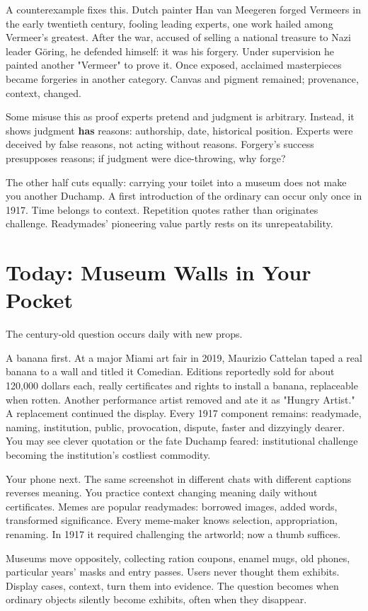 A counterexample fixes this. Dutch painter Han van Meegeren forged Vermeers in the early twentieth century, fooling leading experts, one work hailed among Vermeer's greatest. After the war, accused of selling a national treasure to Nazi leader Göring, he defended himself: it was his forgery. Under supervision he painted another "Vermeer" to prove it. Once exposed, acclaimed masterpieces became forgeries in another category. Canvas and pigment remained; provenance, context, changed.

Some misuse this as proof experts pretend and judgment is arbitrary. Instead, it shows judgment \textbf{has} reasons: authorship, date, historical position. Experts were deceived by false reasons, not acting without reasons. Forgery's success presupposes reasons; if judgment were dice-throwing, why forge?

The other half cuts equally: carrying your toilet into a museum does not make you another Duchamp. A first introduction of the ordinary can occur only once in 1917. Time belongs to context. Repetition quotes rather than originates challenge. Readymades' pioneering value partly rests on its unrepeatability.

\section{Today: Museum Walls in Your Pocket}
The century-old question occurs daily with new props.

A banana first. At a major Miami art fair in 2019, Maurizio Cattelan taped a real banana to a wall and titled it Comedian. Editions reportedly sold for about 120,000 dollars each, really certificates and rights to install a banana, replaceable when rotten. Another performance artist removed and ate it as "Hungry Artist." A replacement continued the display. Every 1917 component remains: readymade, naming, institution, public, provocation, dispute, faster and dizzyingly dearer. You may see clever quotation or the fate Duchamp feared: institutional challenge becoming the institution's costliest commodity.

Your phone next. The same screenshot in different chats with different captions reverses meaning. You practice context changing meaning daily without certificates. Memes are popular readymades: borrowed images, added words, transformed significance. Every meme-maker knows selection, appropriation, renaming. In 1917 it required challenging the artworld; now a thumb suffices.

Museums move oppositely, collecting ration coupons, enamel mugs, old phones, particular years' masks and entry passes. Users never thought them exhibits. Display cases, context, turn them into evidence. The question becomes when ordinary objects silently become exhibits, often when they disappear.

